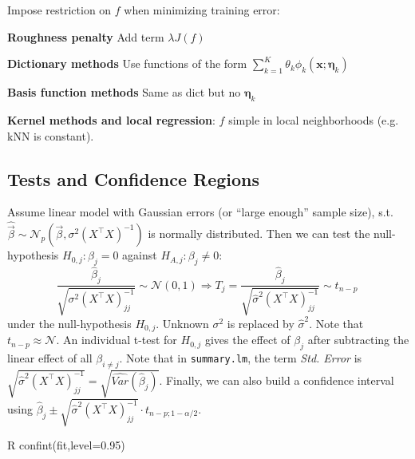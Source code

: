\begin{sectionbox}\nospacing{}
Impose restriction on $f$ when minimizing training error:
\begin{enumeratenosep}[label=\roman*]
    \item \textbf{Roughness penalty} Add term $\lambda J(f)$
    \item \textbf{Dictionary methods} Use functions of the form  $\sum_{k=1}^{K}{{\theta}_k {\phi}_k(\mathbf{x};\mathbf{\eta}_k)}$
    \item \textbf{Basis function methods}  Same as dict but no $\mathbf{\eta}_k$
    \item \textbf{Kernel methods and local regression}: $f$ simple in local neighborhoods (e.g. kNN is constant).
\end{enumeratenosep}
\end{sectionbox}



\subsection{Tests and Confidence Regions}\label{subsec:tests_and_confidence_regions}
\begin{sectionbox}[T-test]\nospacing{}
  Assume linear model with Gaussian errors (or ``large enough'' sample size), s.t. $\hat{\vec{\beta}} \sim \mathcal{N}_{p}\left(\vec{\beta}, \sigma^{2}{(X^{\top}X)}^{-1}\right)$ is normally distributed.
  Then we can test the null-hypothesis $H_{0,j}: \beta_{j} = 0$ against $H_{A,j}: \beta_{j} \neq 0$:
  \[\frac{\hat \beta_{j}}{\sqrt{\sigma^{2}{{(X^{\top}X)}^{-1}_{jj}}}} \sim \mathcal{N}(0,1) \Rightarrow  T_{j} = \frac{\hat \beta_{j}}{\sqrt{\hat \sigma^{2}{{(X^{\top}X)}^{-1}_{jj}}}} \sim t_{n-p}\ \] under the null-hypothesis $H_{0,j}$. Unknown $\sigma^{2}$ is replaced by $\hat \sigma^{2}$. Note that $t_{n-p} \approx \mathcal{N}$.
  An individual t-test for $H_{0,j}$ gives the effect of $\beta_{j}$ after subtracting the linear effect of all $\beta_{i\neq j}$.
  Note that in \verb!summary.lm!, the term \emph{Std. Error} is $\sqrt{\hat \sigma^{2}{{(X^{\top}X)}^{-1}_{jj}}} = \sqrt{\hat{Var}(\hat \beta_{j})}$. Finally, we can also build a confidence interval using $\hat \beta_{j} \pm \sqrt{\hat \sigma^{2}{{(X^{\top}X)}^{-1}_{jj}}} \cdot t_{n-p;1-\alpha/2}$.
\begin{mintlinebox}{R}
  confint(fit,level=0.95)
\end{mintlinebox}
\end{sectionbox}

